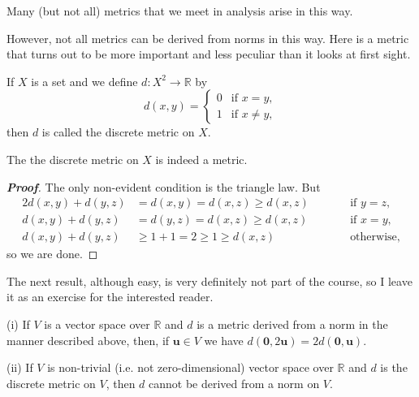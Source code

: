 Many (but not all) metrics that we meet in analysis arise in this way.

However, not all metrics can be derived from norms in this way. Here is a metric that turns out to be more important and less peculiar than it looks at first sight. 

\begin{definition} If $X$ is a set and we define
$d:X^{2}\rightarrow{\mathbb R}$ by 
\begin{equation*}
d(x,y)=
\begin{cases}
0&\text{if $x=y$},\\
1&\text{if $x\neq y$},
\end{cases}
\end{equation*}
then $d$ is called the discrete metric on $X$.
\end{definition}


\begin{theorem}
The the discrete metric on $X$ is indeed a metric.
\end{theorem}
\begin{proof}[\bf Proof] The only non-evident condition is the triangle law.
But
\begin{alignat*}{2}
d(x,y)+d(y,z)&=d(x,y)=d(x,z)\geq d(x,z)&&\qquad\text{if $y=z$},\\
d(x,y)+d(y,z)&=d(y,z)=d(x,z)\geq d(x,z)&&\qquad\text{if $x=y$},\\
d(x,y)+d(y,z)&\geq 1+1=2\geq 1\geq d(x,z)&&\qquad\text{otherwise,}
\end{alignat*}
so we are done.
\end{proof}

The next result, although easy, 
is very definitely not part of the course,
so I leave it as an exercise for the interested reader.
\begin{exercise} (i) If $V$ is a vector space over ${\mathbb R}$
and $d$ is a metric derived from a norm in the manner described above,
then, if ${\mathbf u}\in V$ 
we have $d({\boldsymbol 0},2{\mathbf u})=2d({\boldsymbol 0},{\mathbf u})$.

(ii) If $V$ is non-trivial (i.e. not zero-dimensional) vector space
over ${\mathbb R}$ and $d$ is the discrete metric on $V$, then
$d$ cannot be derived from a norm on $V$.
\end{exercise}

